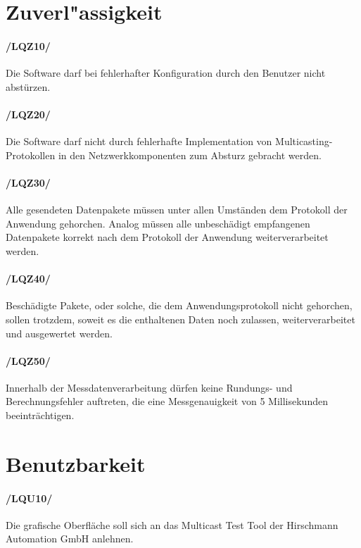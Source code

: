 \section{Zuverl"assigkeit}

\paragraph{/LQZ10/} Die Software darf bei fehlerhafter Konfiguration durch den
Benutzer nicht abstürzen.

\paragraph{/LQZ20/} Die Software darf nicht durch fehlerhafte Implementation von
Multicasting-Protokollen in den Netzwerkkomponenten zum Absturz gebracht werden.

\paragraph{/LQZ30/} Alle gesendeten Datenpakete müssen unter allen Umständen dem
Protokoll der Anwendung gehorchen. Analog müssen alle unbeschädigt empfangenen
Datenpakete korrekt nach dem Protokoll der Anwendung weiterverarbeitet werden.

\paragraph{/LQZ40/} Beschädigte Pakete, oder solche, die dem Anwendungsprotokoll
nicht gehorchen, sollen trotzdem, soweit es die enthaltenen Daten noch zulassen,
weiterverarbeitet und ausgewertet werden.

\paragraph{/LQZ50/} Innerhalb der Messdatenverarbeitung dürfen keine
Rundungs- und Berechnungsfehler auftreten, die eine Messgenauigkeit von 5
Millisekunden beeinträchtigen.

\section{Benutzbarkeit}

\paragraph{/LQU10/} Die grafische Oberfläche soll sich an das Multicast Test
Tool der Hirschmann Automation GmbH anlehnen.

